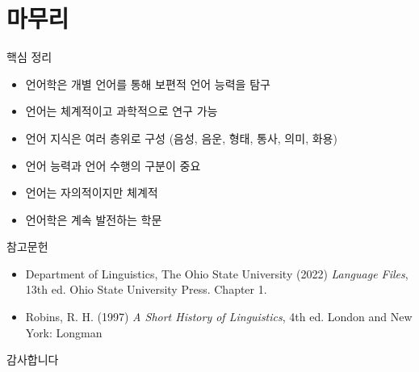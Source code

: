 \documentclass[aspectratio=169]{beamer}
\begin{document}
\section{마무리}

\begin{frame}{핵심 정리}
\begin{itemize}
\item 언어학은 개별 언어를 통해 보편적 언어 능력을 탐구
\item 언어는 체계적이고 과학적으로 연구 가능
\item 언어 지식은 여러 층위로 구성 (음성, 음운, 형태, 통사, 의미, 화용)
\item 언어 능력과 언어 수행의 구분이 중요
\item 언어는 자의적이지만 체계적
\item 언어학은 계속 발전하는 학문
\end{itemize}
\end{frame}

\begin{frame}{참고문헌}
\begin{itemize}
\item Department of Linguistics, The Ohio State University (2022) \textit{Language Files}, 13th ed. Ohio State University Press. Chapter 1.
\item Robins, R. H. (1997) \textit{A Short History of Linguistics}, 4th ed. London and New York: Longman
\end{itemize}
\end{frame}

\begin{frame}
\begin{center}
\Huge{감사합니다}
\end{center}
\end{frame}
\end{document}
